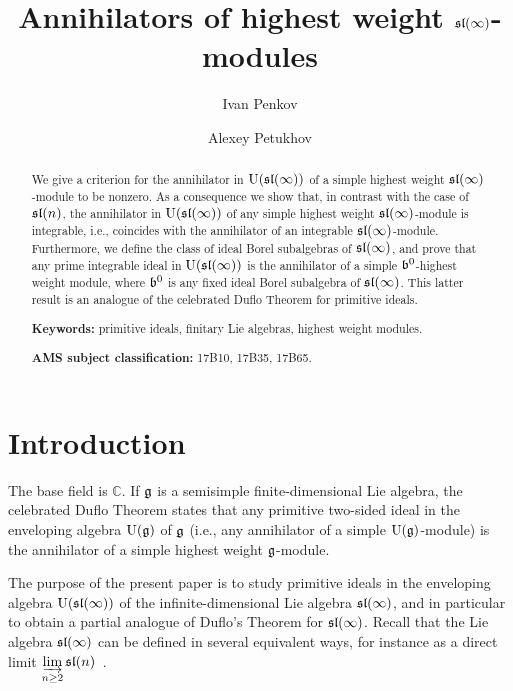 \documentclass[10pt]{amsart}\oddsidemargin -1mm \evensidemargin -1mm \topmargin -15mm\headheight5mm \headsep 3.5mm \textheight 245mm\textwidth 170mm %
\theoremstyle{definition}\newtheorem{theorem}{Theorem}[section]\newtheorem{lemma}[theorem]{Lemma}\newtheorem{remark}[theorem]{Remark}\newtheorem{proposition}[theorem]{Proposition}\newtheorem{corollary}[theorem]{Corollary}\newtheorem{definition}[theorem]{Definition}\newtheorem{Ex}[theorem]{Example}
\begin{document}
\author{Ivan Penkov}\address{Ivan Penkov: Jacobs University Bremen, Campus Ring 1, 28759 Bremen, Germany}\author{Alexey Petukhov}\address{Alexey Petukhov: The University of Manchester, Oxford Rd M13 9PL, Manchester, UK\\ on leave from the Institute for Information Transmission Problems, Bolshoy Karetniy 19-1, Moscow 127994, Russia}
\title{Annihilators of highest weight $\frak{sl}(\infty)$-modules}\maketitle
\begin{abstract} We give a criterion for the annihilator in $\operatorname{\mathrm{U}}(\frak{sl}(\infty))$ of a simple highest weight $\frak{sl}(\infty)$-module to be nonzero. As a consequence we show that, in contrast with the case of $\frak{sl}(n)$, the annihilator in $\operatorname{\mathrm{U}}(\frak{sl}(\infty))$ of any simple highest weight $\frak{sl}(\infty)$-module is integrable, i.e., coincides with the annihilator of an integrable $\frak{sl}(\infty)$-module. Furthermore, we define the class of ideal Borel subalgebras of $\frak{sl}(\infty)$, and prove that any prime integrable ideal in $\operatorname{\mathrm{U}}(\frak{sl}(\infty))$ is the annihilator of a simple $\frak b^0$-highest weight module, where $\frak b^0$ is any fixed ideal Borel subalgebra of $\frak{sl}(\infty)$. This latter result is an analogue of the celebrated Duflo Theorem for primitive ideals.\medskip

{\bf Keywords:} primitive ideals, finitary Lie algebras, highest weight modules.

{\bf AMS subject classification:} 17B10, 17B35, 17B65. \end{abstract}
\section{Introduction}

The base field is $\mathbb C$. If $\frak g$ is a semisimple finite-dimensional Lie algebra, the celebrated Duflo Theorem states that any primitive two-sided ideal in the enveloping algebra $\operatorname{\mathrm{U}}(\frak g)$ of $\frak g$ (i.e., any annihilator of a simple $\operatorname{\mathrm{U}}(\frak g)$-module) is the annihilator of a simple highest weight $\frak g$-module.

The purpose of the present paper is to study primitive ideals in the enveloping algebra $\operatorname{\mathrm{U}}(\frak{sl}(\infty))$ of the infinite-dimensional Lie algebra $\frak{sl}(\infty)$, and in particular to obtain a partial analogue of Duflo's Theorem for $\frak{sl}(\infty)$. Recall that the Lie algebra $\frak{sl}(\infty)$ can be defined in several equivalent ways, for instance as a direct limit $\varinjlim\limits_{n\ge 2}\frak{sl}(n)$~\cite{Ba1, Ba2, DP}.
\end{document}
